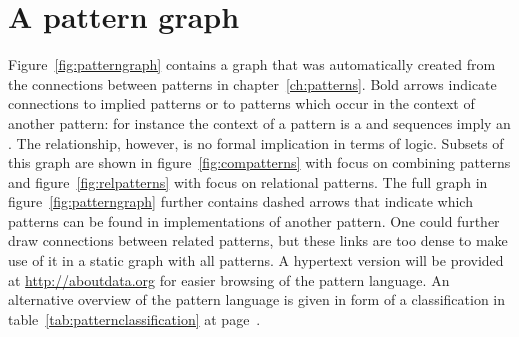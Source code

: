 
\section{A pattern graph}
\label{appendixC}

Figure~\ref{fig:patterngraph} contains a graph that was automatically created
from the connections between patterns in chapter~\ref{ch:patterns}. Bold arrows
indicate connections to implied patterns or to patterns which occur in the
context of another pattern: for instance the context of a 
pattern is a  and sequences imply an . The
relationship, however, is no formal implication in terms of logic.  Subsets of
this graph are shown in figure~\ref{fig:compatterns} with focus on combining
patterns and figure~\ref{fig:relpatterns} with focus on relational patterns.
The full graph in figure~\ref{fig:patterngraph} further contains dashed arrows
that indicate which patterns can be found in implementations of another
pattern.  One could further draw connections between related patterns, but
these links are too dense to make use of it in a static graph with all
patterns. A hypertext version will be provided at \url{http://aboutdata.org}
for easier browsing of the pattern language. An alternative overview of the
pattern language is given in form of a classification in
table~\ref{tab:patternclassification} at
page~\pageref{tab:patternclassification}.

\begin{sidewaysfigure}

\caption{Connections between all patterns}
\label{fig:patterngraph}
\end{sidewaysfigure}

